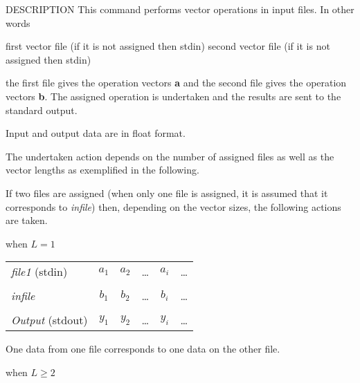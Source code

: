 \begin{synopsis}
\item[vopr] [ --l $L$ ] [ --n $N$ ] [ --i ] [ --a ] [ --s ] [ --m ] [ --d ] 
\item[\ ~~~~] [ --ATAN2 ][ {\em file1} ] [ {\em infile} ]
\end{synopsis}

\begin{qsection}{DESCRIPTION}
This command performs vector operations in input files.
In other words
\begin{description}
first vector file (if it is not assigned then stdin)
second vector file (if it is not assigned then stdin)
\end{description}
the first file gives the operation vectors {\bf a}
and the second file gives the operation vectors {\bf b}.
The assigned operation is undertaken and the results
are sent to the standard output.
\par
Input and output data are in float format.
\par
The undertaken action depends on the number of assigned files
as well as the vector lengths as exemplified in the following.
\par
If two files are assigned (when only one file is assigned,
it is assumed that it corresponds to {\em infile}) then,
depending on the vector sizes, the following actions
are taken.
\begin{description}
\item{when $L=1$}~\\
\begin{tabular}{l|c|c|c|c|c} \cline{2-6}
{\em file1} (stdin)     & {$a_1$} & {$a_2$} & {\dots}
                        & {$a_i$} & {\dots} \\ \cline{2-6}
\multicolumn{6}{c}{}    \\[-10pt] \cline{2-6}
{\em infile}            & {$b_1$} & {$b_2$} & {\dots}
                        & {$b_i$} & {\dots} \\ \cline{2-6}
\multicolumn{6}{c}{}    \\[-10pt] \cline{2-6}
{\em Output} (stdout)   & {$y_1$} & {$y_2$} & {\dots}
                        & {$y_i$} & {\dots} \\ \cline{2-6}
\end{tabular}
\par
One data from one file corresponds to one data on the other file.
\item{when $L\geq 2$}~\\
\begin{tabular}{l|c|c|c|l} \cline{2-5}

\end{tabular}
\end{description}
\end{qsection}
